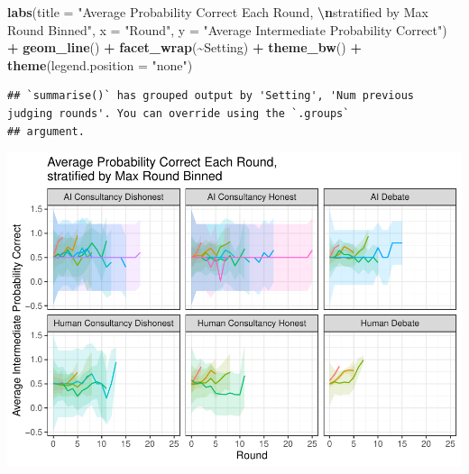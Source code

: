 \documentclass[
]{article}
\newenvironment{Shaded}{\begin{snugshade}}{\end{snugshade}}
\newcommand{\AttributeTok}[1]{\textcolor[rgb]{0.13,0.29,0.53}{#1}}
\newcommand{\FunctionTok}[1]{\textcolor[rgb]{0.13,0.29,0.53}{\textbf{#1}}}
\newcommand{\NormalTok}[1]{#1}
\newcommand{\SpecialCharTok}[1]{\textcolor[rgb]{0.81,0.36,0.00}{\textbf{#1}}}
\newcommand{\StringTok}[1]{\textcolor[rgb]{0.31,0.60,0.02}{#1}}
\begin{document}
\begin{Shaded}
\begin{Highlighting}[]
  \FunctionTok{labs}\NormalTok{(}\AttributeTok{title =} \StringTok{"Average Probability Correct Each Round, }\SpecialCharTok{\textbackslash{}n}\StringTok{stratified by Max Round Binned"}\NormalTok{,}
       \AttributeTok{x =} \StringTok{"Round"}\NormalTok{, }
       \AttributeTok{y =} \StringTok{"Average Intermediate Probability Correct"}\NormalTok{) }\SpecialCharTok{+}
  \FunctionTok{geom\_line}\NormalTok{() }\SpecialCharTok{+}
  \FunctionTok{facet\_wrap}\NormalTok{(}\SpecialCharTok{\textasciitilde{}}\NormalTok{Setting) }\SpecialCharTok{+}
  \FunctionTok{theme\_bw}\NormalTok{() }\SpecialCharTok{+}
  \FunctionTok{theme}\NormalTok{(}\AttributeTok{legend.position =} \StringTok{"none"}\NormalTok{)}
\end{Highlighting}
\end{Shaded}

\begin{verbatim}
## `summarise()` has grouped output by 'Setting', 'Num previous judging rounds'. You can override using the `.groups`
## argument.
\end{verbatim}

\includegraphics{debate-2309_files/figure-latex/strat ggplot-13.pdf}
\end{document}
